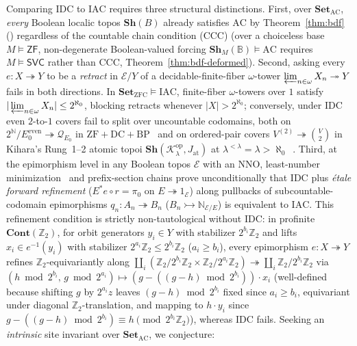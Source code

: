 \documentclass[10pt,twoside,openright]{book}
\theoremstyle{crmplain}
\theoremstyle{crmdef}
\theoremstyle{crmremark}
\begin{document}
Comparing $\mathrm{IDC}$ to $\mathrm{IAC}$ requires three structural distinctions. First, over $\mathbf{Set}_{\mathrm{AC}}$, \emph{every} Boolean localic topos $\mathbf{Sh}(B)$ already satisfies $\mathrm{AC}$ by Theorem~\ref{thm:bdf}~\cite{Barr74} (\cite[\S D4.5]{Johnstone02}) regardless of the countable chain condition ($\mathrm{CCC}$) (over a choiceless base $M \models \mathsf{ZF}$, non-degenerate Boolean-valued forcing $\mathbf{Sh}_M(\mathbb{B}) \models \mathrm{AC}$ requires $M \models \mathsf{SVC}$ rather than $\mathrm{CCC}$, Theorem~\ref{thm:bdf-deformed}). Second, asking every $e : X \twoheadrightarrow Y$ to be a \emph{retract} in $\mathcal{E}/Y$ of a decidable-finite-fiber $\omega$-tower $\varprojlim_{n \in \omega} X_n \twoheadrightarrow Y$ fails in both directions. In $\mathbf{Set}_{\mathrm{ZFC}} \models \mathrm{IAC}$, finite-fiber $\omega$-towers over $1$ satisfy $|\varprojlim_{n \in \omega} X_n| \le 2^{\aleph_0}$, blocking retracts whenever $|X| > 2^{\aleph_0}$; conversely, under $\mathrm{IDC}$ even $2$-to-$1$ covers fail to split over uncountable codomains, both on $2^{\mathbb{N}}/E_0^{\mathrm{even}} \twoheadrightarrow \mathcal{Q}_{E_0}$ in $\mathrm{ZF}+\mathrm{DC}+\mathrm{BP}$~\cite{Serafin23} and on ordered-pair covers $V^{(2)} \twoheadrightarrow \binom{V}{2}$ in Kihara's Rung~1--2 atomic topoi $\mathbf{Sh}(\mathcal{K}_\lambda^{\mathrm{op}}, J_{\mathrm{at}})$ at $\lambda^{<\lambda}=\lambda>\aleph_0$~\cite{Kihara26}. Third, at the epimorphism level in any Boolean topos $\mathcal{E}$ with an $\mathrm{NNO}$, least-number minimization~\cite[\S D5.1]{Johnstone02} and prefix-section chains prove unconditionally that $\mathrm{IDC}$ plus \emph{\'etale forward refinement} ($E^* e \circ r = \pi_0$ on $E \twoheadrightarrow 1_{\mathcal{E}}$) along pullbacks of subcountable-codomain epimorphisms $q_n : A_n \twoheadrightarrow B_n$ ($B_n \rightarrowtail \mathbb{N}_{\mathcal{E}/E}$) is equivalent to $\mathrm{IAC}$. This refinement condition is strictly non-tautological without $\mathrm{IDC}$: in profinite $\mathbf{Cont}(\mathbb{Z}_2)$, for orbit generators $y_i \in Y$ with stabilizer $2^{b_i}\mathbb{Z}_2$ and lifts $x_i \in e^{-1}(y_i)$ with stabilizer $2^{a_i}\mathbb{Z}_2 \le 2^{b_i}\mathbb{Z}_2$ ($a_i \ge b_i$), every epimorphism $e : X \twoheadrightarrow Y$ refines $\mathbb{Z}_2$-equivariantly along $\coprod_i (\mathbb{Z}_2/2^{b_i}\mathbb{Z}_2 \times \mathbb{Z}_2/2^{a_i}\mathbb{Z}_2) \twoheadrightarrow \coprod_i \mathbb{Z}_2/2^{b_i}\mathbb{Z}_2$ via $(h \bmod 2^{b_i},\, g \bmod 2^{a_i}) \mapsto (g - ((g - h) \bmod 2^{b_i})) \cdot x_i$ (well-defined because shifting $g$ by $2^{a_i}z$ leaves $(g-h) \bmod 2^{b_i}$ fixed since $a_i \ge b_i$, equivariant under diagonal $\mathbb{Z}_2$-translation, and mapping to $h \cdot y_i$ since $g - ((g-h)\bmod 2^{b_i}) \equiv h \pmod{2^{b_i}\mathbb{Z}_2}$), whereas $\mathrm{IDC}$ fails. Seeking an \emph{intrinsic} site invariant over $\mathbf{Set}_{\mathrm{AC}}$, we conjecture:
\end{document}
